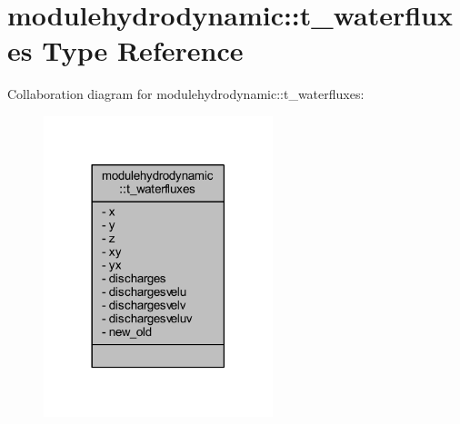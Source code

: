 \hypertarget{structmodulehydrodynamic_1_1t__waterfluxes}{}\section{modulehydrodynamic\+:\+:t\+\_\+waterfluxes Type Reference}
\label{structmodulehydrodynamic_1_1t__waterfluxes}


Collaboration diagram for modulehydrodynamic\+:\+:t\+\_\+waterfluxes\+:\nopagebreak
\begin{figure}[H]
\begin{center}
\leavevmode
\includegraphics[width=189pt]{structmodulehydrodynamic_1_1t__waterfluxes__coll__graph}
\end{center}
\end{figure}

